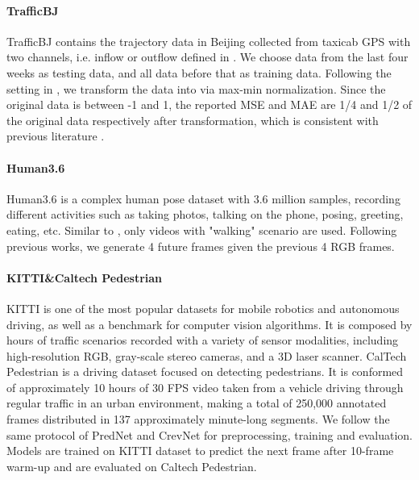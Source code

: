 \documentclass[10pt,twocolumn,letterpaper]{article}
\begin{document}
\paragraph{TrafficBJ} TrafficBJ contains the trajectory data in Beijing collected from taxicab GPS with two channels, i.e. inflow or outflow defined in \cite{zhang2017deep}. We choose data from the last four weeks as testing data, and all data before that as training data. Following the setting in \cite{wang2019memory}, we transform the data into  via max-min normalization. Since the original data is between -1 and 1, the reported MSE and MAE are 1/4 and 1/2 of the original data respectively after transformation, which is consistent with previous literature \cite{guen2020disentangling,wang2019memory}.

\paragraph{Human3.6} Human3.6 \cite{ionescu2013human3} is a complex human pose dataset with 3.6 million samples, recording different activities such as taking photos, talking on the phone, posing, greeting, eating, etc. Similar to \cite{srivastava2015unsupervised,wang2019memory,guen2020disentangling}, only videos with "walking" scenario are used. Following previous works, we generate 4 future frames given the previous 4 RGB frames.

\paragraph{KITTI\&Caltech Pedestrian} KITTI \cite{geiger2013vision} is one of the most popular datasets for mobile robotics and autonomous driving, as well as a benchmark for computer vision algorithms. It is composed by hours of traffic scenarios recorded with a variety of sensor modalities, including high-resolution RGB, gray-scale stereo cameras, and a 3D laser scanner. CalTech Pedestrian \cite{dollarCVPR09peds} is a driving dataset focused on detecting pedestrians. It is conformed of approximately 10 hours of  30 FPS video taken from a vehicle driving through regular traffic in an urban environment, making a total of 250,000 annotated frames distributed in 137 approximately minute-long segments. We follow the same protocol of PredNet \cite{lotter2016deep} and CrevNet \cite{yu2019efficient} for preprocessing, training and evaluation. Models are trained on KITTI dataset  to predict the next frame after 10-frame warm-up and are evaluated on Caltech Pedestrian.
\end{document}
